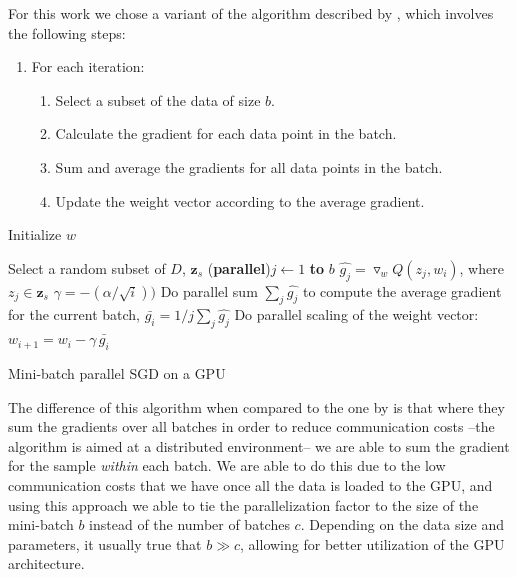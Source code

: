 \documentclass[11pt,a4paper]{article}
\begin{document}
For this work we chose a variant of the algorithm described by \cite{dekel2012optimal}, which involves the following steps:
\begin{enumerate}
	\item  	For each iteration:
	\begin{enumerate}
		\item Select a subset of the data of size $b$.
		\item Calculate the gradient for each data point in the batch.
		\item Sum and average the gradients for all data points in the batch.
		\item Update the weight vector according to the average gradient.
	\end{enumerate}
\end{enumerate}

\begin{algorithm}
	\DontPrintSemicolon %
	Initialize $w$\;
	 {
		Select a random subset of $D$, $\mathbf{z}_s$\;
		\For(\textbf{parallel}){$j \gets 1$ \textbf{to} $b$} {
			$\hat{g_j} = \triangledown_w Q(z_j, w_i)$, where $z_j \in \mathbf{z}_s$\;
		}
		$\gamma = -(\alpha / \sqrt{i}))$\;
		Do parallel sum $\sum_j{\hat{g_j}}$ to compute the average gradient for the current batch, $\bar{g_i} = 1/j \sum_j{\hat{g_j}}$\;
		Do parallel scaling of the weight vector: $w_{i + 1} = w_i - \gamma \,  \bar{g_i}$\;

	}
	\;
	\caption{Mini-batch parallel SGD on a GPU}
	\label{algo:sgd-gpu}
\end{algorithm}

The difference of this algorithm when compared to the one by \cite{dekel2012optimal} is that where
they sum the gradients over all batches in order to reduce communication costs --the algorithm is
aimed at a distributed environment-- we are able to sum the gradient for the sample \textit{within}
each batch. We are able to do this due to the low communication costs that we have once all the
data is loaded to the GPU, and using this approach we able to tie the parallelization factor to the
size of the mini-batch $b$ instead of the number of batches $c$. Depending on the data size and
parameters, it usually true that $b \gg c$, allowing for better utilization of the GPU
architecture.
\end{document}
